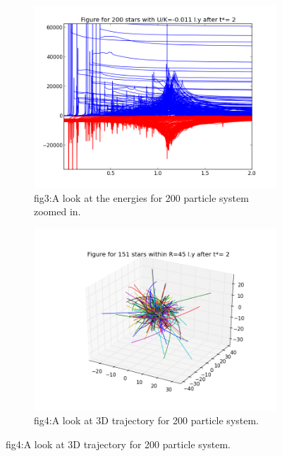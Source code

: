 \documentclass{article}
\begin{document}
\begin{figure}
\centering
\begin{subfigure}{.7\textwidth}
  \centering
  \hspace{-6cm}
  \includegraphics[scale=0.5]{d2-200.png}
  \caption{fig3:A look at the energies for 200 particle system zoomed in.}
  \hspace{-6cm}
  \label{fig:sub1}
\end{subfigure}%
\begin{subfigure}{.7\textwidth}
  \hspace{-5cm}
  \centering
  \includegraphics[scale=0.4]{d3-200.png}
  \caption{fig4:A look at 3D trajectory for 200 particle system.}
  \label{fig:sub2}
\end{subfigure}
\label{fig:test}

\end{figure}
\end{document}
